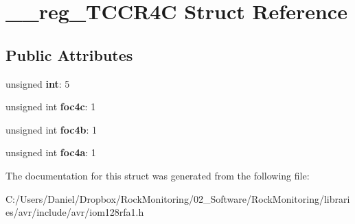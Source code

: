 \hypertarget{struct____reg___t_c_c_r4_c}{}\section{\+\_\+\+\_\+reg\+\_\+\+T\+C\+C\+R4C Struct Reference}
\label{struct____reg___t_c_c_r4_c}
\subsection*{Public Attributes}
\begin{DoxyCompactItemize}
\item 
unsigned {\bfseries int}\+: 5\hypertarget{struct____reg___t_c_c_r4_c_a7dee8e1000c342ba19a4b0bbc0b0c90f}{}\label{struct____reg___t_c_c_r4_c_a7dee8e1000c342ba19a4b0bbc0b0c90f}

\item 
unsigned int {\bfseries foc4c}\+: 1\hypertarget{struct____reg___t_c_c_r4_c_aeb0df60be34e694dfc79dfb6b2ed0b71}{}\label{struct____reg___t_c_c_r4_c_aeb0df60be34e694dfc79dfb6b2ed0b71}

\item 
unsigned int {\bfseries foc4b}\+: 1\hypertarget{struct____reg___t_c_c_r4_c_a8e24544f79b99fa1261b319bb128b7f4}{}\label{struct____reg___t_c_c_r4_c_a8e24544f79b99fa1261b319bb128b7f4}

\item 
unsigned int {\bfseries foc4a}\+: 1\hypertarget{struct____reg___t_c_c_r4_c_a28fd460cc6eb864fe5235f90926442c3}{}\label{struct____reg___t_c_c_r4_c_a28fd460cc6eb864fe5235f90926442c3}

\end{DoxyCompactItemize}


The documentation for this struct was generated from the following file\+:\begin{DoxyCompactItemize}
\item 
C\+:/\+Users/\+Daniel/\+Dropbox/\+Rock\+Monitoring/02\+\_\+\+Software/\+Rock\+Monitoring/libraries/avr/include/avr/iom128rfa1.\+h\end{DoxyCompactItemize}

